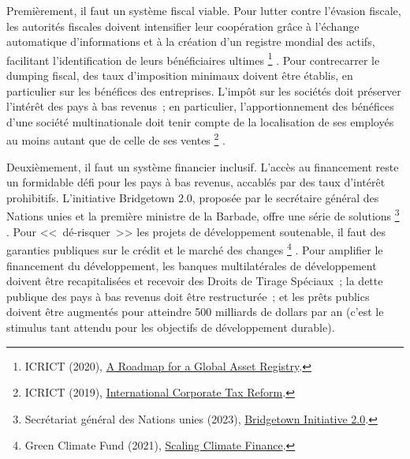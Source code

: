 \documentclass[a5paper,french]{memoir}
\begin{document}
Premièrement, il faut un système fiscal viable. Pour lutter contre l'évasion fiscale, les autorités fiscales doivent intensifier leur coopération grâce à l'échange automatique d'informations et à la création d'un registre mondial des actifs, facilitant l'identification de leurs bénéficiaires ultimes
\footnote{ICRICT (2020), \href{https://static1.squarespace.com/static/5a0c602bf43b5594845abb81/t/5c988368eef1a1538c2ae7eb/1553498989927/GAR.pdf}{A Roadmap for a Global Asset Registry}.}%
. Pour contrecarrer le dumping fiscal, des taux d'imposition minimaux doivent être établis, en particulier sur les bénéfices des entreprises. L'impôt sur les sociétés doit préserver l'intérêt des pays à bas revenus~; en particulier, l'apportionnement des bénéfices d'une société multinationale doit tenir compte de la localisation de ses employés au moins autant que de celle de ses ventes
\footnote{ICRICT (2019), \href{https://static1.squarespace.com/static/5a0c602bf43b5594845abb81/t/5d979e6dc5f7cb7b66842c49/1570217588721/ICRICT-INTERNATIONAL+CORPORATE+TAX+REFORM.pdf}{International Corporate Tax Reform}.}%
. 

Deuxièmement, il faut un système financier inclusif. L'accès au financement reste un formidable défi pour les pays à bas revenus, accablés par des taux d'intérêt prohibitifs. L'initiative Bridgetown 2.0, proposée par le secrétaire général des Nations unies et la première ministre de la Barbade, offre une série de solutions
\footnote{Secrétariat général des Nations unies (2023), \href{https://www.un.org/sustainabledevelopment/blog/2023/04/press-release-with-clock-ticking-for-the-sdgs-un-chief-and-barbados-prime-minister-call-for-urgent-action-to-transform-broken-global-financial-system/}{Bridgetown Initiative 2.0}.}%
. Pour <<~dé-risquer~>> les projets de développement soutenable, il faut des garanties publiques sur le crédit et le marché des changes
\footnote{Green Climate Fund (2021), \href{https://www.greenclimate.fund/sites/default/files/document/scaling-climate-finance-context-covid-19-full-report\_0.pdf}{Scaling Climate Finance}.}%
. Pour amplifier le financement du développement, les banques multilatérales de développement doivent être recapitalisées et recevoir des Droits de Tirage Spéciaux~; la dette publique des pays à bas revenus doit être restructurée~; et les prêts publics doivent être augmentés pour atteindre 500 milliards de dollars par an (c'est le stimulus tant attendu pour les objectifs de développement durable). 
\end{document}
